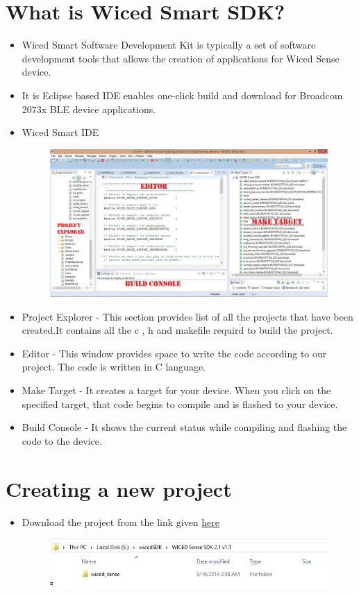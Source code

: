\documentclass[11pt,a4paper]{article}
\begin{document}
\section{What is Wiced Smart SDK?}
\begin{itemize}
    \item Wiced Smart Software Development Kit is typically a set of software development tools that allows the creation of applications for Wiced Sense device.
    \item It is Eclipse based IDE enables one-click build and download for  Broadcom 2073x BLE device applications. 
    \item Wiced Smart IDE 
    \begin{figure}[h]
    \centering
	\includegraphics[scale=0.4]{Wiced-sdk.JPG}
	\end{figure}
	
	\item Project Explorer - This section provides list of all the projects that have been created.It contains all the c , h and makefile requird to build the project.
	\item Editor - This window provides space to write the code according to our project. The code is written in C language.
	\item Make Target - It creates a target for your device. When you click on the specified target, that code begins to compile and is flashed to your device.
	\item Build Console - It shows the current status while compiling and flashing the code to the device.
\end{itemize}

\newpage
\section{Creating a new project}
 \begin{itemize}
 \item Download the project from the link given
\href{https://community.cypress.com/docs/DOC-2213}{here}
 
 
  \begin{figure}[h]
    \centering
	\includegraphics[scale=0.6]{download.JPG}
	\end{figure}
 \end{itemize} 
 
\end{document}
